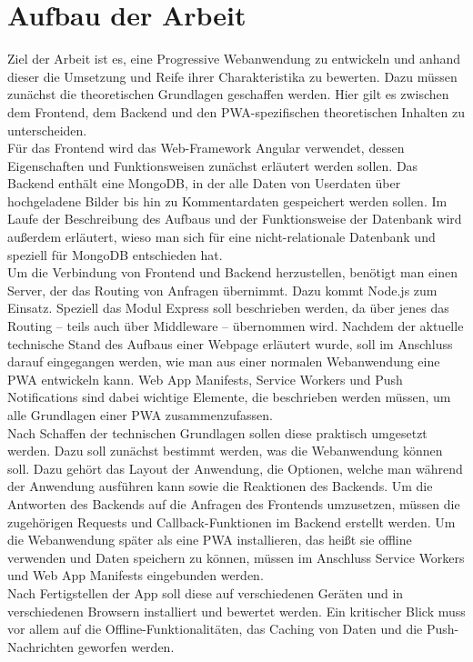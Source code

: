 \section{Aufbau der Arbeit}\label{se:AufbauDerArbeit}
Ziel der Arbeit ist es, eine Progressive Webanwendung zu entwickeln und anhand dieser die Umsetzung und Reife ihrer Charakteristika zu bewerten. 
Dazu müssen zunächst die theoretischen Grundlagen geschaffen werden. Hier gilt es zwischen dem Frontend, dem Backend und den PWA-spezifischen theoretischen Inhalten zu unterscheiden.\\
Für das Frontend wird das Web-Framework Angular verwendet, dessen Eigenschaften und Funktionsweisen zunächst erläutert werden sollen. Das Backend enthält eine MongoDB, in der alle Daten von Userdaten über hochgeladene Bilder bis hin zu Kommentardaten gespeichert werden sollen. Im Laufe der Beschreibung des Aufbaus und der Funktionsweise der Datenbank wird außerdem erläutert, wieso man sich für eine nicht-relationale Datenbank und speziell für MongoDB entschieden hat.\\
Um die Verbindung von Frontend und Backend herzustellen, benötigt man einen Server, der das Routing von Anfragen übernimmt. Dazu kommt Node.js zum Einsatz. Speziell das Modul Express soll beschrieben werden, da über jenes das Routing – teils auch über Middleware – übernommen wird.
Nachdem der aktuelle technische Stand des Aufbaus einer Webpage erläutert wurde, soll im Anschluss darauf eingegangen werden, wie man aus einer normalen Webanwendung eine PWA entwickeln kann. Web App Manifests, Service Workers und Push Notifications sind dabei wichtige Elemente, die beschrieben werden müssen, um alle Grundlagen einer PWA zusammenzufassen. \\
Nach Schaffen der technischen Grundlagen sollen diese praktisch umgesetzt werden. Dazu soll zunächst bestimmt werden, was die Webanwendung können soll. Dazu gehört das Layout der Anwendung, die Optionen, welche man während der Anwendung ausführen kann sowie die Reaktionen des Backends. Um die Antworten des Backends auf die Anfragen des Frontends umzusetzen, müssen die zugehörigen Requests und Callback-Funktionen im Backend erstellt werden. Um die Webanwendung später als eine PWA installieren, das heißt sie offline verwenden und Daten speichern zu können, müssen im Anschluss Service Workers und Web App Manifests eingebunden werden.\\
Nach Fertigstellen der App soll diese auf verschiedenen Geräten und in verschiedenen Browsern installiert und bewertet werden. Ein kritischer Blick muss vor allem auf die Offline-Funktionalitäten, das Caching von Daten und die Push-Nachrichten geworfen werden. 
